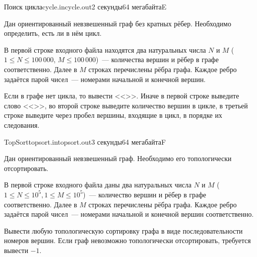 \documentclass[12pt,a4paper,oneside,twocolumn,landscape]{article}
\renewcommand{\t}[1]{\ifmmode{\mathtt{#1}}\else{\texttt{#1}}\fi}
\begin{document}
\bigskip\bigskip
\begin{problem}{Поиск цикла}{cycle.in}{cycle.out}{2 секунды}{64 мегабайта}{E}

Дан ориентированный невзвешенный граф без кратных рёбер.
Необходимо определить, есть ли в нём цикл.

\InputFile
В первой строке входного файла находятся два натуральных числа $N$ и $M$ 
($1 \leqslant N \leqslant 100\,000$, $M \leqslant 100\,000$)~---
количества вершин и рёбер в графе соответственно. Далее в $M$ строках
перечислены рёбра графа. Каждое ребро  задаётся парой чисел~---
номерами начальной и конечной вершин.

\OutputFile
Если в графе нет цикла, то вывести <<\t{NO}>>.
Иначе в первой строке выведите слово <<\t{YES}>>,
во второй строке выведите количество вершин в цикле,
в третьей строке выведите через пробел вершины, входящие
в цикл, в порядке их следования.


\Examples

\begin{example}
%
%
\end{example}


\end{problem}

\bigskip\bigskip
\begin{problem}{TopSort}{topsort.in}{topsort.out}{3 секунды}{64 мегабайта}{F}



Дан ориентированный невзвешенный граф. Необходимо его топологически отсортировать.

\InputFile
В первой строке входного файла даны два натуральных числа $N$ и $M$ ($1 \leqslant N \leqslant 10^5, 1 \leqslant M \leqslant 10^5$)~--- количество вершин и рёбер в графе соответственно. Далее в $M$ строках перечислены рёбра графа. Каждое ребро задаётся
парой чисел~--- номерами начальной и конечной вершин соответственно.

\OutputFile
Вывести любую топологическую сортировку графа в виде последовательности номеров вершин. Если граф невозможно топологически отсортировать, требуется вывести $-1$.



\Examples

\begin{example}
%
%
\end{example}


\end{problem}
\end{document}
